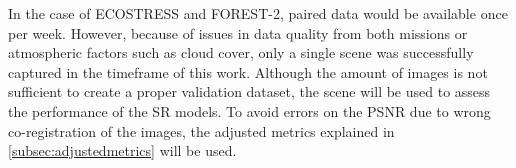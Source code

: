     In the case of ECOSTRESS and FOREST-2, paired data would be available once per week. However, because of issues in data quality from both missions or atmospheric factors such as cloud cover, only a single scene was successfully captured in the timeframe of this work. Although the amount of images is not sufficient to create a proper validation dataset, the scene will be used to assess the performance of the SR models. To avoid errors on the PSNR due to wrong co-registration of the images, the adjusted metrics explained in \ref{subsec:adjustedmetrics} will be used.




\newpage